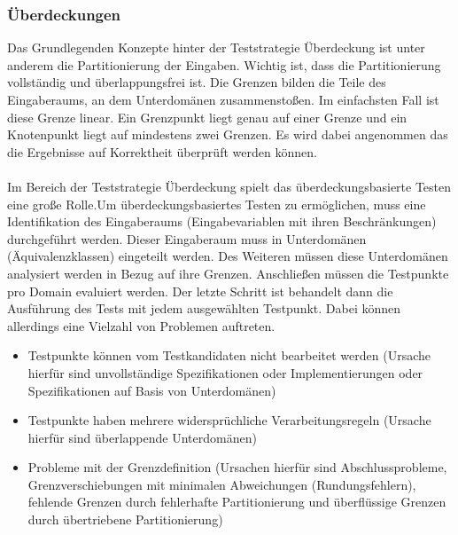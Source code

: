 \subsubsection{Überdeckungen}
Das Grundlegenden Konzepte hinter der Teststrategie Überdeckung ist unter anderem die Partitionierung der Eingaben. Wichtig ist, dass die Partitionierung vollständig und überlappungsfrei ist. Die Grenzen bilden die Teile des Eingaberaums, an dem Unterdomänen zusammenstoßen. Im einfachsten Fall ist diese Grenze linear.  Ein Grenzpunkt liegt genau auf einer Grenze und ein Knotenpunkt liegt auf mindestens zwei Grenzen. Es wird dabei angenommen das die Ergebnisse auf Korrektheit überprüft werden können.
\\\\
Im Bereich der Teststrategie Überdeckung spielt das überdeckungsbasierte Testen eine große Rolle.Um überdeckungsbasiertes Testen zu ermöglichen, muss eine Identifikation des  Eingaberaums (Eingabevariablen mit ihren Beschränkungen) durchgeführt werden. Dieser Eingaberaum muss in Unterdomänen (Äquivalenzklassen) eingeteilt werden. Des Weiteren müssen diese Unterdomänen analysiert werden in Bezug auf ihre Grenzen. Anschließen müssen die Testpunkte pro Domain evaluiert werden.
Der letzte Schritt ist behandelt dann die Ausführung des Tests mit jedem ausgewählten Testpunkt. Dabei können allerdings eine Vielzahl von Problemen auftreten.
\begin{itemize}
\item Testpunkte können vom Testkandidaten nicht bearbeitet werden (Ursache hierfür sind unvollständige Spezifikationen oder Implementierungen oder Spezifikationen auf Basis von Unterdomänen)
\item Testpunkte haben mehrere widersprüchliche Verarbeitungsregeln (Ursache hierfür sind überlappende Unterdomänen)
\item Probleme mit der Grenzdefinition (Ursachen hierfür sind Abschlussprobleme, Grenzverschiebungen mit minimalen Abweichungen (Rundungsfehlern), fehlende Grenzen durch fehlerhafte Partitionierung und überflüssige Grenzen durch übertriebene Partitionierung)
\end{itemize}

